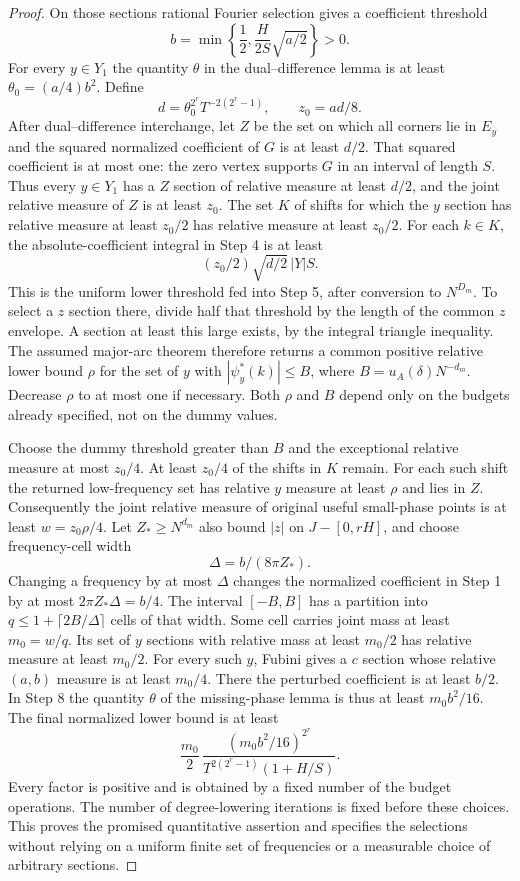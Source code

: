 \documentclass[11pt]{article}
\theoremstyle{definition}
\begin{document}
\begin{proof}
On those sections rational Fourier selection gives a coefficient threshold
\[
 b=\min\left\{\frac12,\frac{H}{2S}\sqrt{a/2}\right\}>0.
\]
For every $y\in Y_1$ the quantity $\theta$ in the dual--difference lemma is at least
$\theta_0=(a/4)b^2$. Define
\[
 d=\theta_0^{2^r}T^{-2(2^r-1)},\qquad z_0=ad/8.
\]
After dual--difference interchange, let $Z$ be the set on which all corners lie in $E_y$
and the squared normalized coefficient of $G$ is at least $d/2$. That squared coefficient
is at most one: the zero vertex supports $G$ in an interval of length $S$.
Thus every $y\in Y_1$ has a $Z$ section of relative measure at least $d/2$, and the joint
relative measure of $Z$ is at least $z_0$. The set $K$ of shifts for which the $y$ section
has relative measure at least $z_0/2$ has relative measure at least $z_0/2$.
For each $k\in K$, the absolute-coefficient integral in Step 4 is at least
\[
 (z_0/2)\sqrt{d/2}\,|Y|S.
\]
This is the uniform lower threshold fed into Step 5, after conversion to $N^{D_m}$.
To select a $z$ section there, divide half that threshold by the length of the common
$z$ envelope. A section at least this large exists, by the integral triangle inequality.
The assumed major-arc theorem therefore returns a common positive relative lower bound
$\rho$ for the set of $y$ with $|\psi_y^*(k)|\leq B$, where $B=u_A(\delta)N^{-d_m}$.
Decrease $\rho$ to at most one if necessary. Both $\rho$ and $B$ depend only on the budgets
already specified, not on the dummy values.

Choose the dummy threshold greater than $B$ and the exceptional relative measure at most
$z_0/4$. At least $z_0/4$ of the shifts in $K$ remain. For each such shift the returned
low-frequency set has relative $y$ measure at least $\rho$ and lies in $Z$. Consequently
the joint relative measure of original useful small-phase points is at least
$w=z_0\rho/4$.
Let $Z_*\geq N^{d_m}$ also bound $|z|$ on $J-[0,rH]$, and choose frequency-cell width
\[
 \Delta=b/(8\pi Z_*).
\]
Changing a frequency by at most $\Delta$ changes the normalized coefficient in Step 1 by
at most $2\pi Z_*\Delta=b/4$. The interval $[-B,B]$ has a partition into
$q\leq1+\lceil2B/\Delta\rceil$ cells of that width. Some cell carries joint mass at least
$m_0=w/q$. Its set of $y$ sections with relative mass at least $m_0/2$ has relative measure
at least $m_0/2$. For every such $y$, Fubini gives a $c$ section whose relative $(a,b)$ measure
is at least $m_0/4$. There the perturbed coefficient is at least $b/2$. In Step 8 the
quantity $\theta$ of the missing-phase lemma is thus at least $m_0b^2/16$. The final
normalized lower bound is at least
\[
 \frac{m_0}{2}\,
 \frac{(m_0b^2/16)^{2^r}}{T^{2(2^r-1)}(1+H/S)}.
\]
Every factor is positive and is obtained by a fixed number of the budget operations.
The number of degree-lowering iterations is fixed before these choices. This proves the
promised quantitative assertion and specifies the selections without relying on a
uniform finite set of frequencies or a measurable choice of arbitrary sections.
\end{proof}
\end{document}
